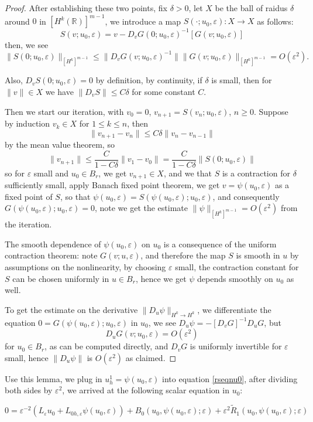 \documentclass[letterpaper,11pt]{article}
\newcommand{\R}{\mathbb{R}}
\newcommand{\eps}{\varepsilon}
\numberwithin{equation}{section}
\theoremstyle{plain}
\begin{document}
\begin{proof}
After establishing these two points, fix $\delta>0$, let $X$ be the ball of raidus $\delta$ around $0$ in $ [H^k(\R)]^{m-1}$, we introduce a map $S(\cdot; u_0,\eps): X \to X$ as follows:
\[
S(v; u_0,\eps) = v - D_vG(0;u_0, \eps)^{-1}[G(v;u_0,\eps)]
\]
then, we see
\[
\|S(0;u_0,\eps) \|_{[H^k]^{m-1}} \le \|D_vG(v;u_0, \eps)^{-1}\| \|G(v;u_0, \eps)\|_{[H^k]^{m-1}} = O(\eps^2).
\]

Also, $D_vS(0;u_0,\eps) = 0$ by definition, by continuity, if $\delta$ is small, then for $\|v\| \in X$ we have $\|D_vS\| \le C\delta$ for some constant $C$. 

Then we start our iteration, with $v_0 = 0$, $v_{n+1} = S(v_n;u_0,\eps)$, $n\ge 0$. Suppose by induction $v_k \in X$ for $1\le k \le n$, then
\[
\|v_{n+1}-v_n\| \le C\delta\|v_n-v_{n-1}\|
\]
by the mean value theorem, so
\[
\|v_{n+1}\| \le \frac{C}{1-C\delta}\|v_1-v_0\| = \frac{C}{1-C\delta}\|S(0;u_0,\eps)\|
\]
so for $\eps$ small and $u_0 \in B_r$, we get $v_{n+1} \in X$, and we that $S$ is a contraction for $\delta$ sufficiently small, apply Banach fixed point theorem, we get $v = \psi(u_0,\eps)$ as a fixed point of $S$, so that $\psi(u_0,\eps)= S(\psi(u_0,\eps);u_0,\eps)$, and consequently $G(\psi(u_0,\eps); u_0,\eps) = 0$, note we get the estimate $\|\psi\|_{[H^k]^{m-1}} = O(\eps^2)$ from the iteration.

The smooth dependence of $\psi(u_0,\eps)$ on $u_0$ is a consequence of the uniform contraction theorem: note $G(v;u,\eps)$, and therefore the map $S$ is smooth in $u$ by assumptions on the nonlinearity, by choosing $\eps$ small, the contraction constant for $S$ can be chosen uniformly in $u \in B_r$, hence we get $\psi$ depends smoothly on $u_0$ as well.

To get the estimate on the derivative $\|D_u\psi\|_{H^k \to H^k}$, we differentiate the equation $0 = G(\psi(u_0,\eps);u_0,\eps)$ in $u_0$, we see $D_u\psi = -[D_vG]^{-1}D_uG$, but 
\[
D_u G (v;u_0,\eps)= O(\eps^2)
\]
for $u_0 \in B_r$, as can be computed directly, and $D_vG$ is uniformly invertible for $\eps$ small, hence $\|D_u\psi\|$ is $O(\eps^2)$ as claimed. 
\end{proof}

Use this lemma, we plug in $u_h^1 = \psi(u_0,\eps)$ into equation \eqref{rseqnu0}, after dividing both sides by $\eps^2$, we arrived at the following scalar equation in $u_0$:

\begin{equation} \label{1dnl}
0 = \eps^{-2}\left( L_{\eps} u_0 + L_{0h,\eps} \psi(u_0,\eps) \right)+B_0(u_0, \psi(u_0,\eps);\eps)+\eps^2 \tilde{R}_1(u_0, \psi(u_0,\eps);\eps)
\end{equation}
\end{document}
